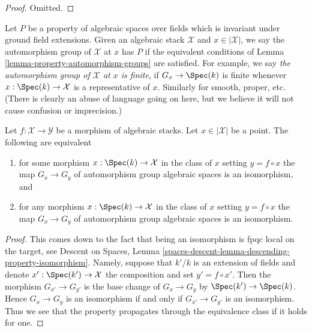 \begin{proof}
Omitted.
\end{proof}

\begin{remark}
\label{remark-property-automorphism-groups}
Let $P$ be a property of algebraic spaces over fields which is invariant
under ground field extensions. Given an algebraic stack $\mathcal{X}$
and $x \in |\mathcal{X}|$, we say the automorphism group of $\mathcal{X}$
at $x$ has $P$ if the equivalent conditions of
Lemma \ref{lemma-property-automorphism-groups} are satisfied.
For example, we say {\it the automorphism group of $\mathcal{X}$
at $x$ is finite}, if $G_x \to \Spec(k)$ is finite whenever
$x : \Spec(k) \to \mathcal{X}$ is a representative of $x$.
Similarly for smooth, proper, etc.
(There is clearly an abuse of language going on here, but we
believe it will not cause confusion or imprecision.)
\end{remark}

\begin{lemma}
\label{lemma-iso-automorphism-groups}
Let $f : \mathcal{X} \to \mathcal{Y}$ be a morphism of algebraic stacks.
Let $x \in |\mathcal{X}|$ be a point. The following are equivalent
\begin{enumerate}
\item for some morphism $x : \Spec(k) \to \mathcal{X}$ in the
class of $x$ setting $y = f \circ x$ the map
$G_x \to G_y$ of automorphism group algebraic spaces
is an isomorphism, and
\item for any morphism $x : \Spec(k) \to \mathcal{X}$ in the
class of $x$ setting $y = f \circ x$ the map
$G_x \to G_y$ of automorphism group algebraic spaces
is an isomorphism.
\end{enumerate}
\end{lemma}

\begin{proof}
This comes down to the fact that being an isomorphism
is fpqc local on the target, see
Descent on Spaces, Lemma
\ref{spaces-descent-lemma-descending-property-isomorphism}.
Namely, suppose that $k'/k$ is an extension of fields and
denote $x' : \Spec(k') \to \mathcal{X}$ the composition
and set $y' = f \circ x'$.
Then the morphism $G_{x'} \to G_{y'}$ is the base change
of $G_x \to G_y$ by $\Spec(k') \to \Spec(k)$.
Hence $G_x \to G_y$ is an isomorphism
if and only if $G_{x'} \to G_{y'}$ is an isomorphism.
Thus we see that the property propagates through the
equivalence class if it holds for one.
\end{proof}

